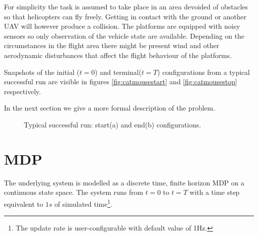 \documentclass[a4paper,11pt]{report}
\begin{document}
For simplicity the task is assumed to take place in an area devoided of obstacles so that helicopters can fly freely. Getting in contact with the ground or another UAV will however produce a collision.
The platforms are equipped with noisy sensors so only observation of the vehicle state are available.  
Depending on the circumstances in the flight area there might be present wind and other aerodynamic disturbances that affect the flight behaviour of the platforms.

Snapshots of the initial ($t=0$) and terminal($t=T$) configurations from a typical successful run are visible in figures \ref{fig:catmousestart} and \ref{fig:catmousestop} respectively. 

In the next section we give a more formal description of the problem.

\begin{figure}[ht]
\centering
{}
\caption{Typical successful run: start(a) and end(b) configurations. \label{fig:catmouse}}
\end{figure}

\section{MDP}

The underlying system is modelled as a discrete time, finite horizon MDP on a continuous state space. The system runs from $t=0$ to $t=T$ with a time step equivalent to $1s$ of simulated time\footnote{The update rate is user-configurable with default value of 1Hz.}. 
\end{document}
